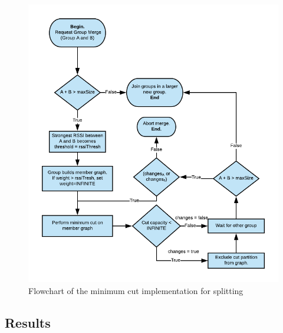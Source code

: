 \begin{figure}
	\includegraphics[width=\textwidth]{Images/mincutflow2.png}
		\caption{Flowchart of the minimum cut implementation for splitting}%
		\label{fig:mincutflow}%
\end{figure}




\subsection{Results}

